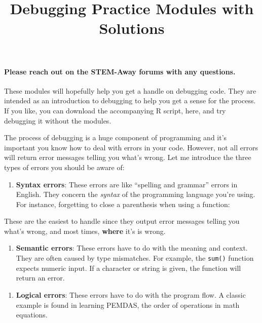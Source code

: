 \documentclass[
]{article}
\title{Debugging Practice Modules with Solutions}
\author{}
\date{\vspace{-2.5em}}
\providecommand{\tightlist}{%
  \setlength{\itemsep}{0pt}\setlength{\parskip}{0pt}}
\begin{document}
\maketitle

\hypertarget{please-reach-out-on-the-stem-away-forums-with-any-questions.}{%
\paragraph{Please reach out on the STEM-Away forums with any
questions.}\label{please-reach-out-on-the-stem-away-forums-with-any-questions.}}

These modules will hopefully help you get a handle on debugging code.
They are intended as an introduction to debugging to help you get a
sense for the process. If you like, you can download the accompanying R
script, here, and try debugging it without the modules.

The process of debugging is a huge component of programming and it's
important you know how to deal with errors in your code. However, not
all errors will return error messages telling you what's wrong. Let me
introduce the three types of errors you should be aware of:

\begin{enumerate}
\def\labelenumi{\arabic{enumi}.}
\tightlist
\item
  \textbf{Syntax errors}: These errors are like ``spelling and grammar''
  errors in English. They concern the \emph{syntax} of the programming
  language you're using. For instance, forgetting to close a parenthesis
  when using a function:
\end{enumerate}

These are the easiest to handle since they output error messages telling
you what's wrong, and most times, \textbf{where} it's is wrong.

\begin{enumerate}
\def\labelenumi{\arabic{enumi}.}
\setcounter{enumi}{1}
\tightlist
\item
  \textbf{Semantic errors}: These errors have to do with the meaning and
  context. They are often caused by type mismatches. For example, the
  \texttt{sum()} function expects numeric input. If a character or
  string is given, the function will return an error.
\end{enumerate}

\begin{enumerate}
\def\labelenumi{\arabic{enumi}.}
\setcounter{enumi}{2}
\tightlist
\item
  \textbf{Logical errors}: These errors have to do with the program
  flow. A classic example is found in learning PEMDAS, the order of
  operations in math equations.
\end{enumerate}
\end{document}
